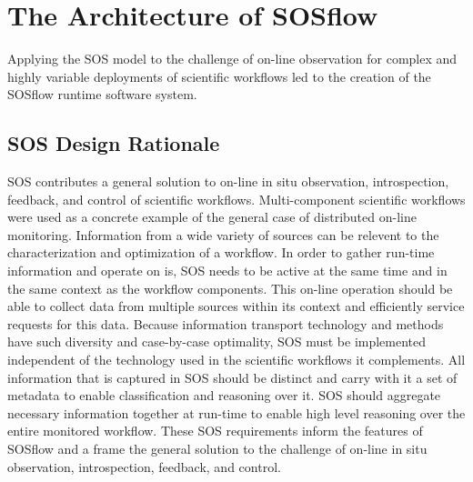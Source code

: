 
\section{The Architecture of SOSflow}
Applying the SOS model to the challenge of on-line observation for
complex and highly variable deployments of scientific workflows led to
the creation of the SOSflow runtime software system.

\subsection{SOS Design Rationale}
SOS contributes a general solution to on-line in situ
observation, introspection, feedback, and control of scientific
workflows.
%
Multi-component scientific workflows were used as a concrete example
of the general case of distributed on-line monitoring.
%
Information from a wide variety of sources can be relevent to the
characterization and optimization of a workflow.
%
In order to gather run-time information and operate on is, SOS needs
to be active at the same time and in the same context as the workflow
components.
%
This on-line operation should be able to collect data from multiple
sources within its context and efficiently service requests
for this data.
%
Because information transport technology and methods have such
diversity and case-by-case optimality, SOS must be implemented
independent of the technology used in the scientific workflows it
complements.
%
All information that is captured in SOS should be distinct and carry
with it a set of metadata to enable classification and reasoning over
it.
%
SOS should aggregate necessary information together at run-time to
enable high level reasoning over the entire monitored workflow.
%
These SOS requirements inform the features of SOSflow and a frame the
general solution to the challenge of on-line in situ observation,
introspection, feedback, and control.

